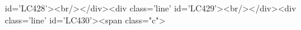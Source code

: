 id='LC428'><br/></div><div class='line' id='LC429'><br/></div><div class='line' id='LC430'><span class="c">%